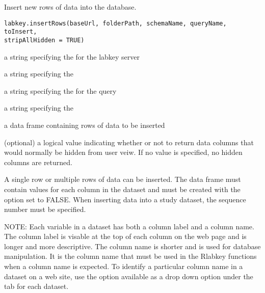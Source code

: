 \documentclass{article}
\begin{document}
\begin{Description}\relax
Insert new rows of data into the database.
\end{Description}
\begin{Usage}
\begin{verbatim}
labkey.insertRows(baseUrl, folderPath, schemaName, queryName, toInsert, 
stripAllHidden = TRUE)
\end{verbatim}
\end{Usage}
\begin{Arguments}
\begin{ldescription}
\item[\code{baseUrl}] a string specifying the for the labkey server
\item[\code{folderPath}] a string specifying the  
\item[\code{schemaName}] a string specifying the   for the query
\item[\code{queryName}] a string specifying the   
\item[\code{toInsert}] a data frame containing rows of data to be inserted
\item[\code{stripAllHidden}] (optional) a logical value indicating whether or not to return data columns that would 
normally be hidden from user veiw. If no value is specified, no hidden columns are returned.
\end{ldescription}
\end{Arguments}
\begin{Details}\relax
A single row or multiple rows of data can be inserted.  The  data frame must contain
values for each column in the dataset and must be created with the  option
set to FALSE. When inserting data into a study dataset, the sequence number must be specified.

NOTE: Each variable in a dataset has both a column label and a column name. The column label is visable at the top
of each column on the web page and is longer and more descriptive. The column name is shorter and is
used  for database manipulation. It is the column name that must be used in
the Rlabkey functions when a column name is expected. To identify a particular column name in a dataset on
a web site, use the  option available as a drop down option under the 
tab for each dataset.
\end{Details}
\end{document}
